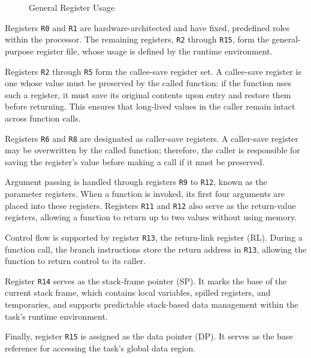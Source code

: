 \begin{figure}[H]
\begin{center}
\begin{tikzpicture}[x=1cm, y=1cm, scale=0.7, transform shape]
\end{tikzpicture} 
\end{center} 
\caption{General Register Usage} 
\label{fig:general-registers-usage} 
\end{figure} 


Registers \texttt{R0} and \texttt{R1} are hardware-architected and have fixed, predefined roles within the processor. The remaining registers, \texttt{R2} through \texttt{R15}, form the general-purpose register file, whose usage is defined by the runtime environment. 

Registers \texttt{R2} through \texttt{R5} form the callee-save register set. A callee-save register is one whose value must be preserved by the called function: if the function uses such a register, it must save its original contents upon entry and restore them before returning. This ensures that long-lived values in the caller remain intact across function calls.

Registers \texttt{R6} and \texttt{R8} are designated as caller-save registers. A caller-save register may be overwritten by the called function; therefore, the caller is responsible for saving the register’s value before making a call if it must be preserved.

Argument passing is handled through registers \texttt{R9} to \texttt{R12}, known as the parameter registers. When a function is invoked, its first four arguments are placed into these registers. Registers \texttt{R11} and \texttt{R12} also serve as the return-value registers, allowing a function to return up to two values without using memory.

Control flow is supported by register \texttt{R13}, the return-link register (RL). During a function call, the branch instructions store the return address in \texttt{R13}, allowing the function to return control to its caller.

Register \texttt{R14} serves as the stack-frame pointer (SP). It marks the base of the current stack frame, which contains local variables, spilled registers, and temporaries, and supports predictable stack-based data management within the task’s runtime environment.

Finally, register \texttt{R15} is assigned as the data pointer (DP). It serves as the base reference for accessing the task’s global data region.

